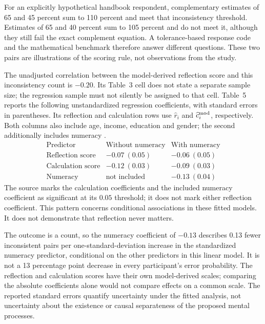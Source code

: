 For an explicitly hypothetical handbook respondent, complementary estimates
of 65 and 45 percent sum to 110 percent and meet that inconsistency threshold.
Estimates of 65 and 40 percent sum to 105 percent and do not meet it, although
they still fail the exact complement equation. A tolerance-based response code
and the mathematical benchmark therefore answer different questions. These
two pairs are illustrations of the scoring rule, not observations from the study.

The unadjusted correlation between the model-derived reflection score and this
inconsistency count is \(-0.20\). Its Table~3 cell does not state a separate
sample size; the regression sample must not silently be assigned to that cell.
Table~5 reports the following unstandardized
regression coefficients, with standard errors in parentheses. Its reflection
and calculation rows use \(\widehat r_i\) and
\(\widehat c_i^{\rm mod}\), respectively. Both columns
also include age, income, education and gender; the second additionally
includes numeracy \cite[tables~3 and 5, pp.~6--8]{SinayevPeters2015Calculation}.
\[
\begin{array}{l|rr}
 \text{Predictor}&\text{Without numeracy}&\text{With numeracy}\\\hline
 \text{Reflection score}&-0.07\ (0.05)&-0.06\ (0.05)\\
 \text{Calculation score}&-0.12\ (0.03)&-0.09\ (0.03)\\
 \text{Numeracy}&\text{not included}&-0.13\ (0.04)
\end{array}
\]
The source marks the calculation coefficients and the included numeracy
coefficient as significant at its \(0.05\) threshold; it does not mark either
reflection coefficient. This pattern concerns conditional associations in
these fitted models. It does not demonstrate that reflection never matters.

The outcome is a count, so the numeracy coefficient of \(-0.13\) describes
0.13 fewer inconsistent pairs per one-standard-deviation increase in the
standardized numeracy predictor, conditional on the other predictors in this
linear model. It is not a 13 percentage point decrease in every participant's
error probability. The reflection and calculation scores have their own
model-derived scales; comparing the absolute coefficients alone would not
compare effects on a common scale. The reported standard errors quantify
uncertainty under the fitted analysis, not uncertainty about the existence or
causal separateness of the proposed mental processes.

